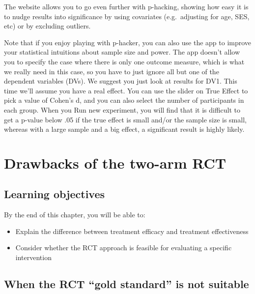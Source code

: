 \documentclass{krantz}
\begin{document}
The website allows you to go even further with p-hacking, showing how easy it is to nudge results into significance by using covariates (e.g.~adjusting for age, SES, etc) or by excluding outliers.

Note that if you enjoy playing with p-hacker, you can also use the app to improve your statistical intuitions about sample size and power. The app doesn't allow you to specify the case where there is only one outcome measure, which is what we really need in this case, so you have to just ignore all but one of the dependent variables (DVs). We suggest you just look at results for DV1. This time we'll assume you have a real effect. You can use the slider on True Effect to pick a value of Cohen's d, and you can also select the number of participants in each group. When you Run new experiment, you will find that it is difficult to get a p-value below .05 if the true effect is small and/or the sample size is small, whereas with a large sample and a big effect, a significant result is highly likely.

\hypertarget{drawbacks}{%
\chapter{Drawbacks of the two-arm RCT}\label{drawbacks}}

\hypertarget{learning-objectives-12}{%
\section{Learning objectives}\label{learning-objectives-12}}

By the end of this chapter, you will be able to:

\begin{itemize}
\item
  Explain the difference between treatment efficacy and treatment effectiveness
\item
  Consider whether the RCT approach is feasible for evaluating a specific intervention
\end{itemize}

\hypertarget{when-the-rct-gold-standard-is-not-suitable}{%
\section{When the RCT ``gold standard'' is not suitable}\label{when-the-rct-gold-standard-is-not-suitable}}
\end{document}
